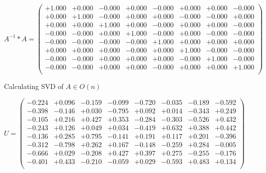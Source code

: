 \documentclass[9pt]{article}
\theoremstyle{plain}
\theoremstyle{definition}
\theoremstyle{remark}
\numberwithin{equation}{section}
\begin{document}
$A^{-1} *A = \left(
\begin{array}{
cccccccc}
+1.000 & +0.000 & -0.000 & +0.000 & -0.000 & +0.000 & +0.000 & -0.000 \\
+0.000 & +1.000 & -0.000 & +0.000 & +0.000 & -0.000 & -0.000 & +0.000 \\
+0.000 & +0.000 & +1.000 & +0.000 & -0.000 & +0.000 & +0.000 & -0.000 \\
-0.000 & -0.000 & +0.000 & +1.000 & -0.000 & +0.000 & -0.000 & -0.000 \\
-0.000 & -0.000 & -0.000 & -0.000 & +1.000 & +0.000 & +0.000 & +0.000 \\
+0.000 & +0.000 & +0.000 & -0.000 & +0.000 & +1.000 & -0.000 & -0.000 \\
-0.000 & -0.000 & +0.000 & +0.000 & +0.000 & -0.000 & +1.000 & -0.000 \\
-0.000 & -0.000 & +0.000 & +0.000 & -0.000 & +0.000 & +0.000 & +1.000 \\
\end{array}
\right)$ \newline 

Calculating SVD of  $A \in O(n)$

$U = \left(
\begin{array}{
cccccccc}
-0.224 & +0.096 & -0.159 & -0.099 & -0.720 & -0.035 & -0.189 & -0.592 \\
-0.398 & -0.146 & +0.030 & -0.795 & +0.092 & +0.014 & -0.343 & +0.249 \\
-0.105 & +0.216 & +0.427 & +0.353 & -0.284 & -0.303 & -0.526 & +0.432 \\
-0.243 & +0.126 & +0.049 & +0.034 & -0.419 & +0.632 & +0.388 & +0.442 \\
-0.136 & +0.285 & +0.795 & -0.141 & +0.191 & +0.117 & +0.201 & -0.396 \\
-0.312 & -0.798 & +0.262 & +0.167 & -0.148 & -0.259 & +0.284 & -0.005 \\
-0.666 & +0.029 & -0.208 & +0.427 & +0.397 & +0.275 & -0.255 & -0.176 \\
-0.401 & +0.433 & -0.210 & -0.059 & +0.029 & -0.593 & +0.483 & +0.134 \\
\end{array}
\right)$ \newline 
\end{document}
